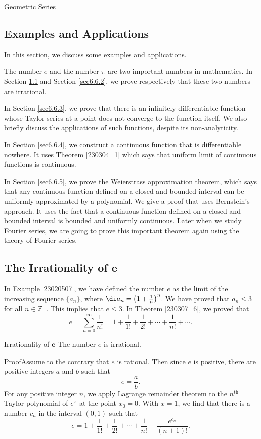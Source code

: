 \begin{example}[label=230305_16]{Geometric Series}
\begin{example}[label=230304_9]{}
\begin{example}{}
\begin{example}{}
\vp


\section{Examples and Applications}\label{sec6.6}
In this section, we discuss some examples and applications.

The number $e$ and the number $\pi$ are two important numbers in mathematics. 
In Section \ref{sec6.6.1} and Section \ref{sec6.6.2}, we prove respectively that these two numbers are irrational. 

In Section \ref{sec6.6.3}, we prove that there is an infinitely differentiable function whose Taylor series at a point does not converge to the function itself. We also briefly discuss the applications of such functions, despite its non-analyticity.


In Section \ref{sec6.6.4}, we construct a continuous function that is differentiable nowhere. It uses Theorem \ref{230304_1} which says that uniform limit of continuous functions is continuous.

 
In Section \ref{sec6.6.5}, we prove the Weierstrass approximation theorem, which says that any continuous function defined on a closed and bounded interval can be uniformly approximated by a polynomial. We give a proof that uses Bernstein's approach. It uses the fact that a continuous function defined on a closed and bounded interval is bounded and uniformly continuous.  Later when we study Fourier series, we are going to prove this important theorem again using the theory of Fourier series.
 

\subsection[The Irrationality of $e$]{The Irrationality of $\pmb{e}$}\label{sec6.6.1}
In Example \ref{23020507}, we have defined the number $e$ as the limit of the increasing sequence $\{a_n\}$, where $\di a_n=\left(1+\frac{1}{n}\right)^n$. We have proved that $a_n\leq 3$ for all $n\in\mathbb{Z}^+$. This implies that $e\leq 3$. In Theorem \ref{230307_6}, we proved that
\[e=\sum_{n=0}^{\infty}\frac{1}{n!}=1+\frac{1}{1!}+\frac{1}{2!}+\cdots+\frac{1}{n!}+\cdots.\]

\begin{theorem}{Irrationality of $\pmb{e}$}
The number $e$ is irrational.
\end{theorem}
\begin{myproof}{Proof}Assume to the contrary that $e$ is rational. Then since $e$ is positive, there are positive integers $a$ and $b$ such that
\[e=\frac{a}{b}.\]
For any positive integer $n$, we apply  Lagrange remainder theorem to the $n^{\text{th}}$ Taylor polynomial of $e^x$ at the point $x_0=0$. With $x=1$, we find that there is a number $c_n$ in the interval $(0,1)$ such that
\begin{equation}\label{eq230307_20}e=1+\frac{1}{1!}+\frac{1}{2!}+\cdots+\frac{1}{n!}+\frac{e^{c_n}}{(n+1)!}.\end{equation} 
 

\end{myproof}
\end{example}
\end{example}
\end{example}
\end{example}
